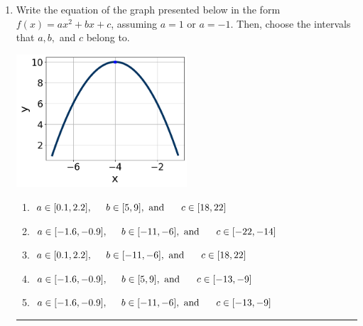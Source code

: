 \documentclass[14pt]{extbook}
\newcommand{\litem}[1]{\item#1\hspace*{-1cm}\rule{\textwidth}{0.4pt}}
\begin{document}
\begin{enumerate}
{\begin{enumerate}[label=\Alph*.]
\end{enumerate} }
\litem{
Write the equation of the graph presented below in the form $f(x)=ax^2+bx+c$, assuming  $a=1$ or $a=-1$. Then, choose the intervals that $a, b,$ and $c$ belong to.
\begin{center}
    \includegraphics[width=0.5\textwidth]{../Figures/quadraticGraphToEquationB.png}
\end{center}
\begin{enumerate}[label=\Alph*.]
\item \( a \in [0.1, 2.2], \hspace*{5mm} b \in [5, 9], \text{ and } \hspace*{5mm} c \in [18, 22] \)
\item \( a \in [-1.6, -0.9], \hspace*{5mm} b \in [-11, -6], \text{ and } \hspace*{5mm} c \in [-22, -14] \)
\item \( a \in [0.1, 2.2], \hspace*{5mm} b \in [-11, -6], \text{ and } \hspace*{5mm} c \in [18, 22] \)
\item \( a \in [-1.6, -0.9], \hspace*{5mm} b \in [5, 9], \text{ and } \hspace*{5mm} c \in [-13, -9] \)
\item \( a \in [-1.6, -0.9], \hspace*{5mm} b \in [-11, -6], \text{ and } \hspace*{5mm} c \in [-13, -9] \)

\end{enumerate} }
\end{enumerate}
\end{document}
